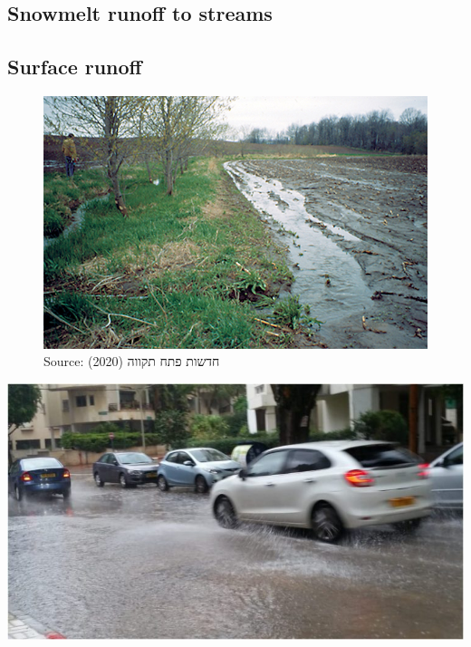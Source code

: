 \documentclass[
  letterpaper,
  DIV=11,
  numbers=noendperiod]{scrreprt}
\begin{document}
\hypertarget{snowmelt-runoff-to-streams}{%
\subsection{Snowmelt runoff to
streams}\label{snowmelt-runoff-to-streams}}

\hypertarget{surface-runoff}{%
\subsection{Surface runoff}\label{surface-runoff}}

\begin{figure}

{\centering \includegraphics{archive/figures/runoff-field.jpg}

}

\caption{Source: חדשות פתח תקווה (2020)}

\end{figure}

\includegraphics{archive/figures/runoff-city.jpg}
\end{document}
